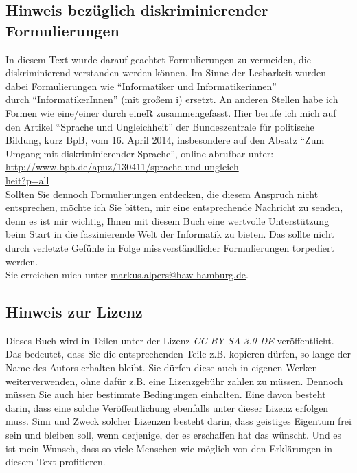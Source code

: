 \subsection*{Hinweis bezüglich diskriminierender Formulierungen}

In diesem Text wurde darauf geachtet Formulierungen zu vermeiden, die diskriminierend verstanden werden können. Im Sinne der Lesbarkeit wurden dabei Formulierungen wie "`Informatiker und Informatikerinnen"'\\durch "`InformatikerInnen"' (mit großem i) ersetzt. An anderen Stellen habe ich Formen wie eine/einer durch eineR zusammengefasst. Hier berufe ich mich auf den Artikel "`Sprache und Ungleichheit"' der Bundeszentrale für politische Bildung, kurz BpB, vom 16. April 2014, insbesondere auf den Absatz "`Zum Umgang mit diskriminierender Sprache"', online abrufbar unter:\\

\url{http://www.bpb.de/apuz/130411/sprache-und-ungleich}\\
\url{heit?p=all}\\

Sollten Sie dennoch Formulierungen entdecken, die diesem Anspruch nicht entsprechen, möchte ich Sie bitten, mir eine entsprechende Nachricht zu senden, denn es ist mir wichtig, Ihnen mit diesem Buch eine wertvolle Unterstützung beim Start in die faszinierende Welt der Informatik zu bieten. Das sollte nicht durch verletzte Gefühle in Folge missverständlicher Formulierungen torpediert werden. \\

Sie erreichen mich unter \url{markus.alpers@haw-hamburg.de}. 

\subsection*{Hinweis zur Lizenz}

Dieses Buch wird in Teilen unter der Lizenz \emph{CC BY-SA 3.0 DE} veröffentlicht. Das bedeutet, dass Sie die entsprechenden Teile z.B. kopieren dürfen, so lange der Name des Autors erhalten bleibt. Sie dürfen diese auch in eigenen Werken weiterverwenden, ohne dafür z.B. eine Lizenzgebühr zahlen zu müssen. Dennoch müssen Sie auch hier bestimmte Bedingungen einhalten. Eine davon besteht darin, dass eine solche Veröffentlichung ebenfalls unter dieser Lizenz erfolgen muss. Sinn und Zweck solcher Lizenzen besteht darin, dass geistiges Eigentum frei sein und bleiben soll, wenn derjenige, der es erschaffen hat das wünscht. Und es ist mein Wunsch, dass so viele Menschen wie möglich von den Erklärungen in diesem Text profitieren.\\

